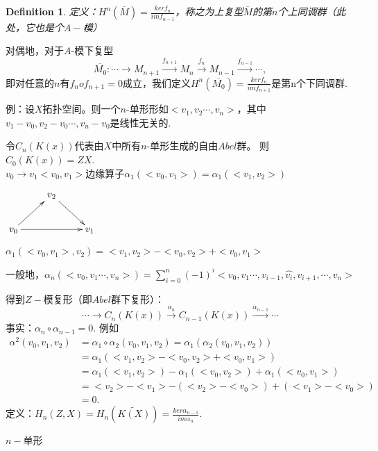 \documentclass[UTF8]{article}
\newtheorem{defn}{Definition}[section]
\begin{document}
\begin{defn}
定义：$H^{n}(\overline{M})=\frac{kerf_{n}}{imf_{n-1}}$，称之为上复型$\overline{M}$的第$n$个上同调群（此处，它也是个$A-$模）
\end{defn}
对偶地，对于$A$-模下复型
$$\overline{M_{0}}:\cdots\rightarrow M_{n+1}\xrightarrow{f_{n+1}}M_{n}\xrightarrow{f_{n}} M_{n-1}\xrightarrow{f_{n-1}}\cdots,$$
即对任意的$n$有$f_{n}of_{n+1}=0$成立，我们定义$H^{n}(\overline{M_{0}})=\frac{kerf_{n}}{imf_{n+1}}$是第n个下同调群.

例：设$X$拓扑空间。则一个$n$-单形形如$<v_{1},v_{2}\cdots,v_{n}>$，其中$v_{1}-v_{0},v_{2}-v_{0}\cdots,v_{n}-v_{0}$是线性无关的.

令$C_{n}(K(x))$代表由$X$中所有$n$-单形生成的自由$Abel$群。
则$C_{0}(K(x))=ZX$.\\
$v_{0}\longrightarrow v_{1}$\qquad$<v_{0},v_{1}>$边缘算子\quad$\alpha_{1}(<v_{0},v_{1}>)=\alpha_{1}(<v_{1},v_{2}>)$

$\xymatrix{&v_{2}\ar[rd]&\\v_{0}\ar[ur]\ar[rr]& &v_{1}}$

\quad$\alpha_{1}(<v_{0},v_{1}>,v_{2})=<v_{1},v_{2}>-<v_{0},v_{2}>+<v_{0},v_{1}>$

一般地，$\alpha_{n}(<v_{0},v_{1}\cdots,v_{n}>)=\sum_{i=0}^{n}(-1)^{i}<v_{0},v_{1}\cdots,v_{i-1},\widehat{v_{i}},v_{i+1},\cdots,v_{n}>$

得到$Z-$模复形（即$Abel$群下复形）：
$$\cdots\rightarrow C_{n}(K(x))\xrightarrow{\alpha_{n}}C_{n-1}(K(x))\xrightarrow{\alpha_{n-1}} \cdots$$
事实：$\alpha_{n}\circ\alpha_{n-1}=0$.
例如
\[\begin{split}
\alpha^{2}(v_{0},v_{1},v_{2})&=\alpha_{1}\circ\alpha_{2}(v_{0},v_{1},v_{2})=\alpha_{1}(\alpha_{2}(v_{0},v_{1},v_{2}))\\
&=\alpha_{1}(<v_{1},v_{2}>-<v_{0},v_{2}>+<v_{0},v_{1}>)\\
&=\alpha_{1}(<v_{1},v_{2}>)-\alpha_{1}(<v_{0},v_{2}>)+\alpha_{1}(<v_{0},v_{1}>)\\
&=<v_{2}>-<v_{1}>-(<v_{2}>-<v_{0}>)+(<v_{1}>-<v_{0}>)\\
&=0.
\end{split}\]
定义：$H_{n}(Z,X)=H_{n}(\tilde{K(X)})=\frac{ker\alpha_{n-1}}{im\alpha_{n}}$.

$n-$单形\qquad
\end{document}
